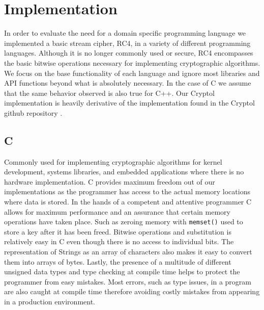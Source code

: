 \section{Implementation}
In order to evaluate the need for a domain specific programming language we implemented a basic stream cipher, RC4, 
in a variety of different programming languages. Although it is no longer commonly used or secure, RC4 encompasses 
the basic bitwise operations necessary for implementing cryptographic algorithms. We focus on the base functionality 
of each language and ignore most libraries and API functions beyond what is absolutely necessary. In the case of C we 
assume that the same behavior observed is also true for C++. Our Cryptol implementation is heavily derivative of the 
implementation found in the Cryptol github repository \cite{CryptolGit}.

\subsection{C}
Commonly used for implementing cryptographic algorithms for kernel development, systems libraries, and embedded applications 
where there is no hardware implementation. C provides maximum freedom out of our implementations as the programmer has access 
to the actual memory locations where data is stored. In the hands of a competent and attentive programmer C allows for maximum 
performance and an assurance that certain memory operations have taken place. Such as zeroing memory with \texttt{memset()} used to store a key after 
it has been freed. Bitwise operations and substitution is relatively easy in C even though there is no access to individual bits. The representation of 
Strings as an array of characters also makes it easy to convert them into arrays of bytes. Lastly, the presence of a multitude of different unsigned 
data types and type checking at compile time helps to protect the programmer from easy mistakes. Most errors, such as type issues, in a program are 
also caught at compile time therefore avoiding costly mistakes from appearing in a production environment.

